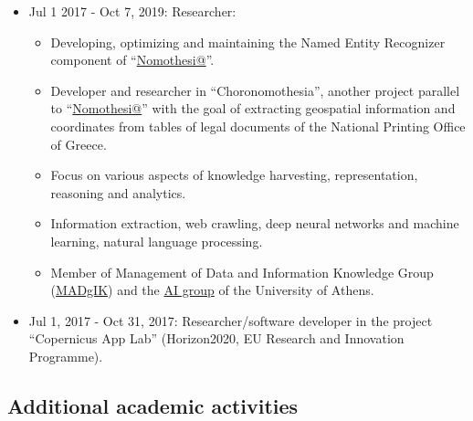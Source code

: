 \documentclass[a4paper,oneside,11pt]{article}
\begin{document}
\begin{itemize}

\item Jul 1 2017 - Oct 7, 2019: Researcher:
	\begin{itemize}

	\item Developing, optimizing and maintaining the Named Entity Recognizer component of ``\href{http://legislation.di.uoa.gr}{Nomothesi@}''.

	\item Developer and researcher in ``Choronomothesia'', another project parallel to ``\href{http://legislation.di.uoa.gr}{Nomothesi@}'' with the goal 
	of extracting geospatial information and coordinates from tables of legal documents of the National Printing Office of Greece.

	\item Focus on various aspects of knowledge harvesting, representation, reasoning and analytics.

	\item Information extraction, web crawling, deep neural networks and machine learning, natural language processing.

	\item Member of Management of Data and Information Knowledge Group (\href{http://www.madgik.di.uoa.gr}{MADgIK}) and the \href{http://kr.di.uoa.gr/}{AI group} of the University of Athens.

	\end{itemize}

\item Jul 1, 2017 - Oct 31, 2017: Researcher/software developer in the project ``Copernicus App Lab'' (Horizon2020, EU Research and Innovation Programme).

\end{itemize}

\subsection*{Additional academic activities}
\end{document}
